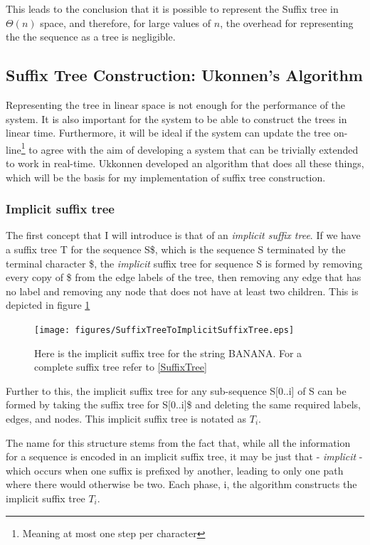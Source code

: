 \documentclass[12pt,twoside,notitlepage]{report}
\begin{document}
			This leads to the conclusion that it is possible to represent the Suffix tree in $\Theta(n)$ space, and therefore, for large values of $n$, the overhead for representing the the sequence as a tree is negligible.
			
			\subsection{\label{subsubsec:Ukonnens}Suffix Tree Construction: Ukonnen's Algorithm}
			Representing the tree in linear space is not enough for the performance of the system. It is also important for the system to be able to construct the trees in linear time. Furthermore, it will be ideal if the system can update the tree on-line\footnote{Meaning at most one step per character} to agree with the aim of developing a system that can be trivially extended to work in real-time. Ukkonnen\cite{Ukkonen1995} developed an algorithm that does all these things, which will be the basis for my implementation of suffix tree construction.
			
			\subsubsection{Implicit suffix tree}
				The first concept that I will introduce is that of an \emph{implicit suffix tree}. If we have a suffix tree T for the sequence S\$, which is the sequence S terminated by the terminal character \$, the \emph{implicit} suffix tree for sequence S is formed by removing every copy of \$ from the edge labels of the tree, then removing any edge that has no label and removing any node that does not have at least two children. This is depicted in figure \ref{fig:implicitSuffixTree}
				
				\begin{figure}[h]
			\centerline{\texttt{[image: figures/SuffixTreeToImplicitSuffixTree.eps]}}
			\caption{\label{fig:implicitSuffixTree} Here is the implicit suffix tree for the string BANANA. For a complete suffix tree refer to \ref{SuffixTree}}
\end{figure}

				Further to this, the implicit suffix tree for any sub-sequence S[0..i] of S can be formed by taking the suffix tree for S[0..i]\$ and deleting the same required labels, edges, and nodes. This implicit suffix tree is notated as $T_i$.
				
				The name for this structure stems from the fact that, while all the information for a sequence is encoded in an implicit suffix tree, it may be just that - \emph{implicit} - which occurs when one suffix is prefixed by another, leading to only one path where there would otherwise be two. Each phase, i, the algorithm constructs the implicit suffix tree $T_i$.
				
\end{document}
